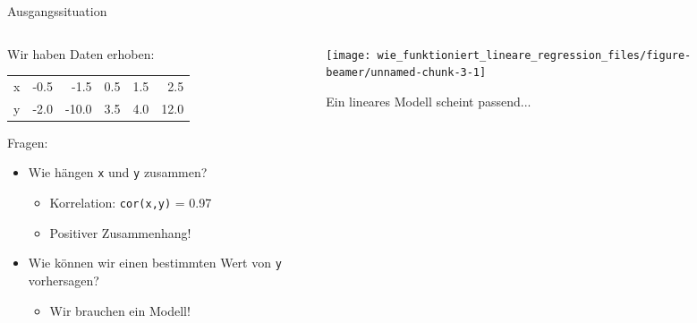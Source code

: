 \documentclass[
  ignorenonframetext,
  t,
  aspectratio=169]{beamer}
\author{}
\date{\vspace{-2.5em}}
\begin{document}
\begin{frame}{Ausgangssituation}
\protect\hypertarget{ausgangssituation}{}
\begin{columns}[T]
\begin{column}{0.48\textwidth}
Wir haben Daten erhoben:

\begin{longtable}[]{@{}lrrrrr@{}}
\toprule
\endhead
x & -0.5 & -1.5 & 0.5 & 1.5 & 2.5 \\
y & -2.0 & -10.0 & 3.5 & 4.0 & 12.0 \\
\bottomrule
\end{longtable}

\pause

Fragen:

\begin{itemize}
  \item Wie hängen \texttt{x} und \texttt{y} zusammen?
  \pause
  \begin{itemize}
    \item[] Korrelation: \texttt{cor(x,y)} = 0.97
    \item[] Positiver Zusammenhang! 
  \end{itemize}
  \pause
  \item Wie können wir einen bestimmten Wert von \texttt{y} vorhersagen?
  \pause
  \begin{itemize}
    \item[] Wir brauchen ein Modell!
  \end{itemize}
\end{itemize}
\end{column}

\begin{column}{0.48\textwidth}
\pause

\texttt{[image: wie\_funktioniert\_lineare\_regression\_files/figure-beamer/unnamed-chunk-3-1]}

\centerline{Ein lineares Modell scheint passend...}
\end{column}
\end{columns}
\end{frame}
\end{document}
